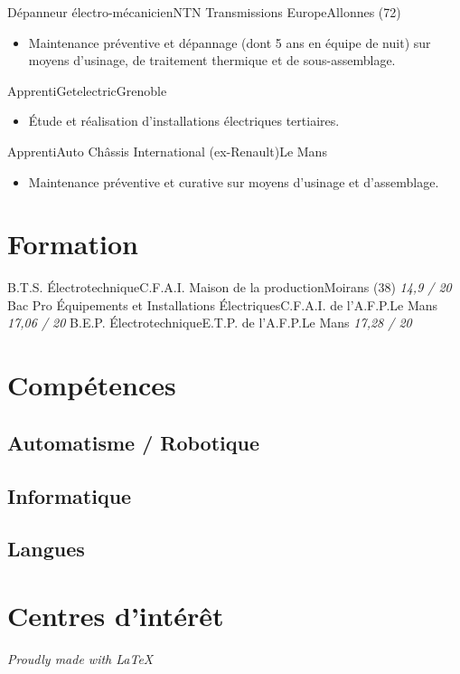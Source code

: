 \documentclass[a4paper,french,10pt]{moderncv}
\begin{document}
{Dépanneur électro-mécanicien}{NTN Transmissions Europe}{Allonnes (72)}{}{%
  \begin{itemize}
    \item Maintenance préventive et dépannage (dont 5 ans en équipe de nuit)
          sur moyens d'usinage, de traitement thermique et de sous-assemblage.
  \end{itemize}
}
%
{Apprenti}{Getelectric}{Grenoble}{}{%
  \begin{itemize}
    \item Étude et réalisation d'installations électriques tertiaires.
  \end{itemize}
}
%
{Apprenti}{Auto Châssis International (ex-Renault)}{Le Mans}{}{%
  \begin{itemize}
    \item Maintenance préventive et curative sur moyens d'usinage et
          d'assemblage.
  \end{itemize}
}

\section{Formation}
%
{B.T.S. Électrotechnique}{C.F.A.I. Maison de la production}{Moirans (38)
}%
{\textit{14,9 / 20}}{}
%
{Bac Pro Équipements et Installations Électriques}{C.F.A.I. de l'A.F.P.}{Le Mans}%
{\textit{17,06 / 20}}{}
%
{B.E.P. Électrotechnique}{E.T.P. de l'A.F.P.}{Le Mans}%
{\textit{17,28 / 20}}{}

\section{Compétences}
\subsection{Automatisme / Robotique}
\subsection{Informatique}

\subsection{Langues}

\section{Centres d'intérêt}

\vfill
\enlargethispage{\footskip}
\centering\textit{\small Proudly made with \LaTeX}
\end{document}
